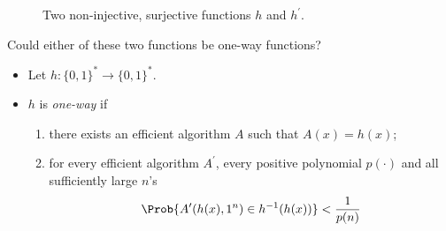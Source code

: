 \begin{frame}
  \begin{figure}
    \hspace{0.1\textwidth}
    \caption{%
      Two non-injective, surjective functions \(h\) and \(h^\prime\).
    }
  \end{figure}

  \begin{exercise}
    Could either of these two functions be one-way functions?
  \end{exercise}
\end{frame}

\begin{frame}
  \begin{definition}
    \begin{itemize}
      \item Let \(h\colon \{0,1\}^*\to \{0,1\}^*\).
      \item \(h\) is \emph{one-way} if
        \begin{enumerate}
          \item there exists an efficient algorithm \(A\) such that \(A(x) 
              = h(x)\);
          \item for every efficient algorithm \(A^\prime\), every positive 
            polynomial \(p(\cdot)\) and all sufficiently large \(n\)'s
            \[\Prob{A^\prime(h(x), 1^n) \in h^{-1}(h(x))} < \frac{1}{p(n)}\]
        \end{enumerate}
    \end{itemize}
  \end{definition}
\end{frame}


